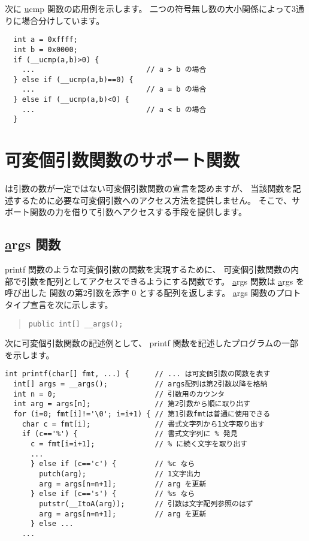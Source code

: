 次に \ul \ul ucmp 関数の応用例を示します。
二つの符号無し数の大小関係によって3通りに場合分けしています。

\begin{mylist}
\begin{verbatim}
  int a = 0xffff;
  int b = 0x0000;
  if (__ucmp(a,b)>0) {
    ...                          // a > b の場合
  } else if (__ucmp(a,b)==0) {
    ...                          // a = b の場合
  } else if (__ucmp(a,b)<0) {
    ...                          // a < b の場合
  }
\end{verbatim}
\end{mylist}

\section{可変個引数関数のサポート関数}

\cmml は引数の数が一定ではない可変個引数関数の宣言を認めますが、
当該関数を記述するために必要な可変個引数へのアクセス方法を提供しません。
そこで、サポート関数の力を借りて引数へアクセスする手段を提供します。

\subsection{\ul \ul args 関数}
\label{chap4:args}

printf 関数のような可変個引数の関数を実現するために、
可変個引数関数の内部で引数を配列としてアクセスできるようにする関数です。
\ul \ul args 関数は \ul \ul args を呼び出した
\cmm 関数の第2引数を添字 0 とする配列を返します。
\ul \ul args 関数のプロトタイプ宣言を次に示します。

\begin{quote}
\begin{verbatim}
public int[] __args();
\end{verbatim}
\end{quote}

次に可変個引数関数の記述例として、
printf 関数を記述したプログラムの一部を示します。

\begin{mylist}
\begin{verbatim}
int printf(char[] fmt, ...) {      // ... は可変個引数の関数を表す
  int[] args = __args();           // args配列は第2引数以降を格納
  int n = 0;                       // 引数用のカウンタ
  int arg = args[n];               // 第2引数から順に取り出す
  for (i=0; fmt[i]!='\0'; i=i+1) { // 第1引数fmtは普通に使用できる
    char c = fmt[i];               // 書式文字列から1文字取り出す
    if (c=='%') {                  // 書式文字列に % 発見
      c = fmt[i=i+1];              // % に続く文字を取り出す
      ...
      } else if (c=='c') {         // %c なら
        putch(arg);                // 1文字出力
        arg = args[n=n+1];         // arg を更新
      } else if (c=='s') {         // %s なら
        putstr(__ItoA(arg));       // 引数は文字配列参照のはず
        arg = args[n=n+1];         // arg を更新
      } else ...
    ...
\end{verbatim}
\end{mylist}


